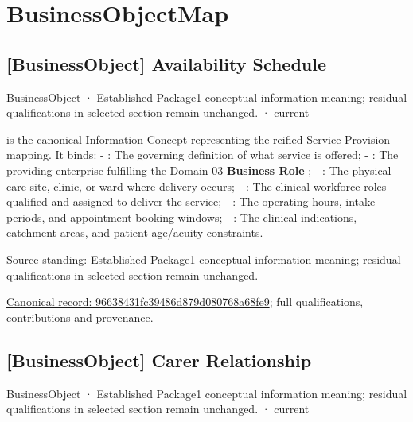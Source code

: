 \chapter{BusinessObjectMap}

\section{[BusinessObject] Availability Schedule}

\label{element:96638431fc39486d879d080768a68fe9}
{\small BusinessObject · Established Package1 conceptual information meaning; residual qualifications in selected section remain unchanged. · current}\par

\texttt{} is the canonical Information Concept representing the reified Service Provision mapping. It binds:
- \textbf{\texttt{}}: The governing definition of what service is offered;
- \textbf{\texttt{}}: The providing enterprise fulfilling the Domain 03 \textbf{Business Role} \texttt{};
- \textbf{\texttt{}}: The physical care site, clinic, or ward where delivery occurs;
- \textbf{\texttt{}}: The clinical workforce roles qualified and assigned to deliver the service;
- \textbf{\texttt{}}: The operating hours, intake periods, and appointment booking windows;
- \textbf{\texttt{}}: The clinical indications, catchment areas, and patient age/acuity constraints.



Source standing: Established Package1 conceptual information meaning; residual qualifications in selected section remain unchanged.


{\footnotesize \href{../../../../continuum/business/business-object/96638431fc39486d879d080768a68fe9.md}{Canonical record: 96638431fc39486d879d080768a68fe9}; full qualifications, contributions and provenance.}\par
\section{[BusinessObject] Carer Relationship}

\label{element:e95d07cf27c041de955665e7b2af8f52}
{\small BusinessObject · Established Package1 conceptual information meaning; residual qualifications in selected section remain unchanged. · current}\par

